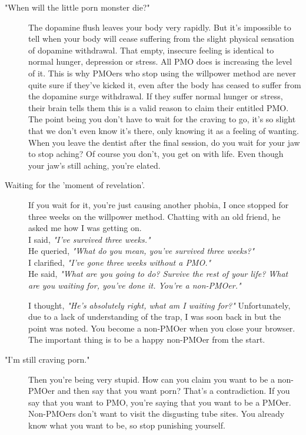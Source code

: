 \documentclass[easypeasy.tex]{subfiles}
\begin{document}
\begin{description}
\begin{description}
      \item["When will the little porn monster die?"]
        The dopamine flush leaves your body very rapidly. But it's impossible to tell when your body will cease suffering from the slight physical sensation of dopamine withdrawal. That empty, insecure feeling is identical to normal hunger, depression or stress. All PMO does is increasing the level of it. This is why PMOers who stop using the willpower method are never quite sure if they've kicked it, even after the body has ceased to suffer from the dopamine surge withdrawal. If they suffer normal hunger or stress, their brain tells them this is a valid reason to claim their entitled PMO. The point being you don't have to wait for the craving to go, it's so slight that we don't even know it's there, only knowing it as a feeling of wanting. When you leave the dentist after the final session, do you wait for your jaw to stop aching? Of course you don't, you get on with life. Even though your jaw's still aching, you're elated.

      \item [Waiting for the 'moment of revelation'.] If you wait for it, you're just causing another phobia, I once stopped for three weeks on the willpower method. Chatting with an old friend, he asked me how I was getting on.\\
        I said, \textit{"I've survived three weeks."}\\
        He queried, \textit{"What do you mean, you've survived three weeks?"}\\
        I clarified, \textit{"I've gone three weeks without a PMO."}\\
        He said, \textit{"What are you going to do? Survive the rest of your life? What are you waiting for, you've done it. You're a non-PMOer."}

        I thought, \textit{"He's absolutely right, what am I waiting for?"} Unfortunately, due to a lack of understanding of the trap, I was soon back in but the point was noted. You become a non-PMOer when you close your browser. The important thing is to be a happy non-PMOer from the start.

      \item ["I'm still craving porn."] Then you're being very stupid. How can you claim you want to be a non-PMOer and then say that you want porn? That's a contradiction. If you say that you want to PMO, you're saying that you want to be a PMOer. Non-PMOers don't want to visit the disgusting tube sites. You already know what you want to be, so stop punishing yourself.


\end{description}
\end{description}
\end{document}
